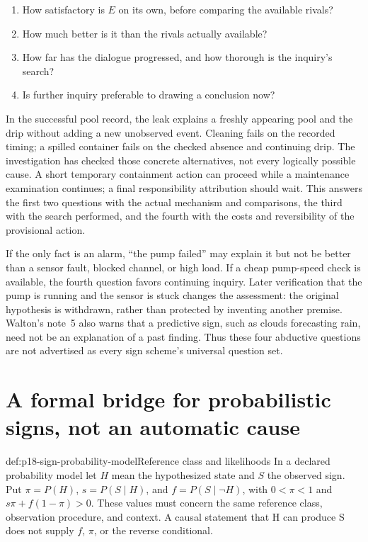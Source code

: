 \begin{enumerate}
\item How satisfactory is \(E\) on its own, before comparing the available rivals?
\item How much better is it than the rivals actually available?
\item How far has the dialogue progressed, and how thorough is the inquiry's search?
\item Is further inquiry preferable to drawing a conclusion now?
\end{enumerate}

In the successful pool record, the leak explains a freshly appearing pool
and the drip without adding a new unobserved event. Cleaning fails on the
recorded timing; a spilled container fails on the checked absence and continuing
drip. The investigation has checked those concrete alternatives, not every
logically possible cause. A short temporary containment action can proceed
while a maintenance examination continues; a final responsibility attribution
should wait. This answers the first two questions with the actual mechanism
and comparisons, the third with the search performed, and the fourth with
the costs and reversibility of the provisional action.

If the only fact is an alarm, ``the pump failed'' may explain it but not be
better than a sensor fault, blocked channel, or high load. If a cheap pump-speed
check is available, the fourth question favors continuing inquiry. Later
verification that the pump is running and the sensor is stuck changes the
assessment: the original hypothesis is withdrawn, rather than protected by
inventing another premise. Walton's note~5 also warns that a predictive sign,
such as clouds forecasting rain, need not be an explanation of a past finding.
Thus these four abductive questions are not advertised as every sign scheme's
universal question set.

\section{A formal bridge for probabilistic signs, not an automatic cause}
\label{sec:p18-sign-probability}

\begin{hbdefinition}{def:p18-sign-probability-model}{Reference class and likelihoods}
In a declared probability model let \(H\) mean the hypothesized state and
\(S\) the observed sign. Put \(\pi=P(H)\), \(s=P(S\mid H)\), and
\(f=P(S\mid\neg H)\), with \(0<\pi<1\) and
\(s\pi+f(1-\pi)>0\). These values must concern the same reference
class, observation procedure, and context. A causal statement that H can
produce S does not supply \(f\), \(\pi\), or the reverse conditional.
\end{hbdefinition}

